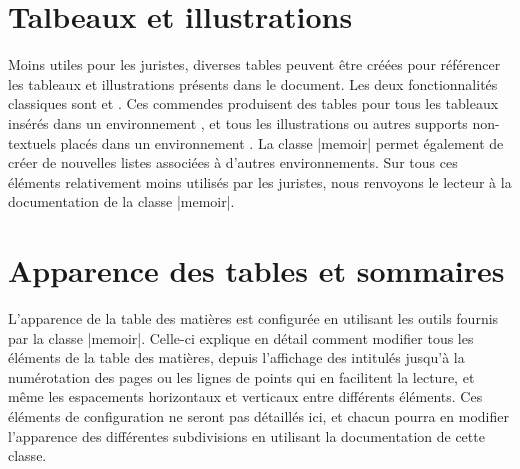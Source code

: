 \section{Talbeaux et illustrations}

Moins utiles pour les juristes, diverses tables peuvent être créées pour référencer les tableaux et illustrations présents dans le document. Les deux fonctionnalités classiques sont  et . Ces commendes produisent des tables pour tous les tableaux insérés dans un environnement , et tous les illustrations ou autres supports non-textuels placés dans un environnement . La classe |memoir| permet également de créer de nouvelles listes associées à d'autres environnements. Sur tous ces éléments relativement moins utilisés par les juristes, nous renvoyons le lecteur à la documentation de la classe |memoir|.



\section{Apparence des tables et sommaires}

L'apparence de la table des matières est configurée en utilisant les outils fournis par la classe |memoir|. Celle-ci explique en détail comment modifier tous les éléments de la table des matières, depuis l'affichage des intitulés jusqu'à la numérotation des pages ou les lignes de points qui en facilitent la lecture, et même les espacements horizontaux et verticaux entre différents éléments. Ces éléments de configuration ne seront pas détaillés ici, et chacun pourra en modifier l'apparence des différentes subdivisions en utilisant la documentation de cette classe.

\begin{noprint}
\renewcommand*{\cftbookpresnum}{\space}
\renewcommand*{\cftbookaftersnum}{.}
\renewcommand*{\cftbookaftersnumb}{\space}
\renewcommand*{\cftbookfont}{\if@modern\sffamily\LARGE\else\large\fi\scshape\hfil}
\renewcommand*{\cftbookpagefont}{\normalsize}
\setlength{\cftbeforebookskip}{2\baselineskip}
\end{noprint}

